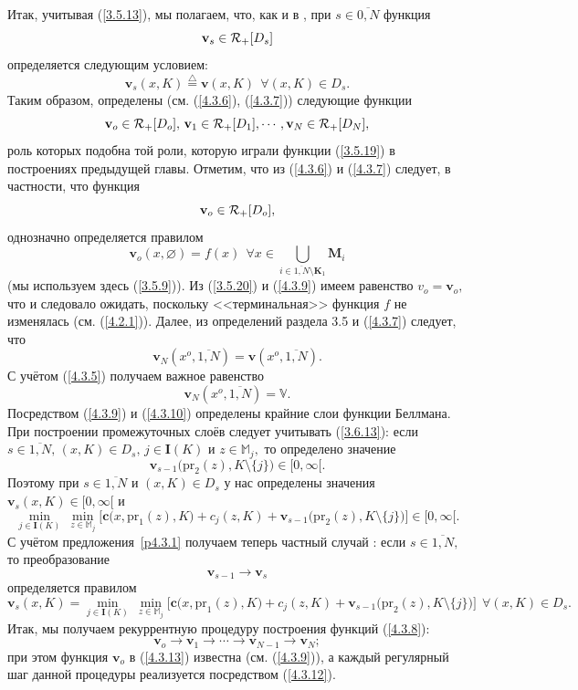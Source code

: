 \documentclass[12pt,twoside]{report}
\newcommand{\bfn}{\begin{equation}}
\newcommand{\efn}{\end{equation}}
\newcommand{\df}{\stackrel{\triangle}{=}}
\newcommand{\ov}{\overline}
\newcommand{\sm}{\setminus}
\newcommand{\fa}{\forall}
\newcommand{\car}{{\cal R}}
\newcommand{\bbm}{{\mathbb M}}
\newcommand{\emp}{\varnothing}
\begin{document}
{Итак, учитывая (\ref{3.5.13}), мы полагаем, что, как и в \cite[(6.12)]{Cha3`}, при
$s\in \ov{0,N}$ функция
\bfn\label{4.3.6`}\mathbf{v}_s\in \car_+ [D_s]
\efn
определяется следующим условием:
\bfn\label{4.3.7}\mathbf{v}_s(x,K) \df \mathbf{v}(x,K)\ \ \fa (x,K)\in D_s.
\efn
Таким образом, определены (см. (\ref{4.3.6}), (\ref{4.3.7})) следующие функции
$$
\mathbf{v}_o\in \car_+[D_o],\,\mathbf{v}_1\in \car_+[D_1],\cdots,
\mathbf{v}_N\in \car_+[D_N],
$$
роль которых подобна той роли, которую играли функции (\ref{3.5.19}) в
построениях предыдущей главы. Отметим, что из (\ref{4.3.6}) и (\ref{4.3.7})
следует, в частности, что функция
\bfn\label{4.3.8}
\mathbf{v}_o\in \car_+[D_o],
\efn
однозначно определяется правилом
\bfn\label{4.3.9}\mathbf{v}_o(x,\emp) = f(x)\ \ \fa x\in
\bigcup\limits_{i\in\ov{1,N}\sm \mathbf{K}_1}\mathbf{M}_i
\efn
(мы используем здесь (\ref{3.5.9})). Из (\ref{3.5.20}) и (\ref{4.3.9})
имеем равенство $v_o = \mathbf{v}_o,$ что и следовало ожидать, поскольку
<<терминальная>> функция $f$ не изменялась
(см. (\ref{4.2.1})). Далее, из определений раздела 3.5 и (\ref{4.3.7})
следует, что
$$
\mathbf{v}_N(x^o,\ov{1,N}) = \mathbf{v}(x^o,\ov{1,N}).
$$
С учётом (\ref{4.3.5}) получаем важное равенство
\bfn\label{4.3.10}\mathbf{v}_N(x^o,\ov{1,N})= \mathbb{V}.
\efn
Посредством (\ref{4.3.9}) и (\ref{4.3.10}) определены крайние слои
функции Беллмана. При построении
промежуточных слоёв следует учитывать (\ref{3.6.13}):  если $s\in\ov{1,N},\,
(x,K)\in D_s,\,j\in \mathbf{I}(K)$ и $z\in \bbm_j,$ то определено значение
$$
\mathbf{v}_{s-1}\bigl(\mathrm{pr}_2(z),K\sm\{j\}\bigl)\in [0,\infty[.
$$
Поэтому при $s\in\ov{1,N}$ и $(x,K)\in D_s$ у нас определены значения
$\mathbf{v}_s(x,K)\in [0,\infty[$ и
$$
\min\limits_{j\in \mathbf{I}(K)}\ \min\limits_{z\in\bbm_j}
\bigl[\mathbf{c}\bigl(x,\mathrm{pr}_1(z),K\bigl) +
c_j(z,K) + \mathbf{v}_{s-1}\bigl(\mathrm{pr}_2(z),K\sm\{j\}\bigl)
\bigl]\in [0,\infty[.
$$
С учётом предложения~\ref{p4.3.1}  получаем теперь частный
случай \cite[предложение~6.1]{Cha3`}:
если $s\in\ov{1,N},$ то преобразование
\bfn\label{4.3.11}
\mathbf{v}_{s-1}\longrightarrow \mathbf{v}_s
\efn
определяется правилом
\bfn\label{4.3.12}
\mathbf{v}_s(x,K) =  \min\limits_{j\in \mathbf{I}(K)}\
\min\limits_{z\in\bbm_j}\bigl[\mathbf{c}\bigl(x,\mathrm{pr}_1(z),K\bigl) +
 c_j(z,K) + \mathbf{v}_{s-1}\bigl(\mathrm{pr}_2(z),K\sm\{j\}\bigl)\bigl]\ \
\fa (x,K)\in  D_s.
\efn
Итак, мы получаем рекуррентную процедуру построения функций (\ref{4.3.8}):
\bfn\label{4.3.13}
\mathbf{v}_o\longrightarrow  \mathbf{v}_1\longrightarrow\cdots
\longrightarrow \mathbf{v}_{N-1}\longrightarrow \mathbf{v}_N;
\efn
при этом функция $\mathbf{v}_o$ в (\ref{4.3.13}) известна
(см. (\ref{4.3.9})), а каждый регулярный
шаг данной процедуры реализуется посредством  (\ref{4.3.12}).

}
\end{document}
